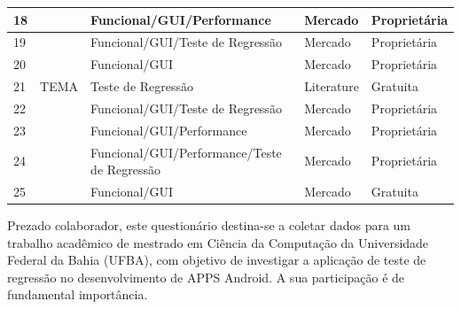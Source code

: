 \begin{table}[h!]
\begin{center}
\begin{tabular}{m{0.2cm}m{3cm}m{5cm}m{3cm}m{3cm}}
        18 & \cite{seetest} & Funcional/GUI/Performance & Mercado & Proprietária\\\hline
        19 & \cite{squish} & Funcional/GUI/Teste de Regressão & Mercado & Proprietária\\\hline
        20 & \cite{telerik} & Funcional/GUI & Mercado & Proprietária\\\hline
        21 & TEMA \cite{} & Teste de Regressão & Literature & Gratuita\\\hline
        22 & \cite{testcomplete} & Funcional/GUI/Teste de Regressão & Mercado & Proprietária\\\hline
        23 & \cite{testingbot} & Funcional/GUI/Performance & Mercado & Proprietária\\\hline
        24 & \cite{uft} & Funcional/GUI/Performance/Teste de Regressão & Mercado & Proprietária\\\hline
        25 & \cite{uiautomator} & Funcional/GUI & Mercado & Gratuita\\\hline
\end{tabular}
\end{center}
\end{table}




\label{sec:formulariopesquisa}


Prezado colaborador, este questionário destina-se a coletar dados para um trabalho acadêmico de mestrado em Ciência da Computação da Universidade Federal da Bahia (UFBA), com objetivo de investigar a aplicação de teste de regressão no desenvolvimento de \ac{APPS} Android. A sua participação é de fundamental importância.


